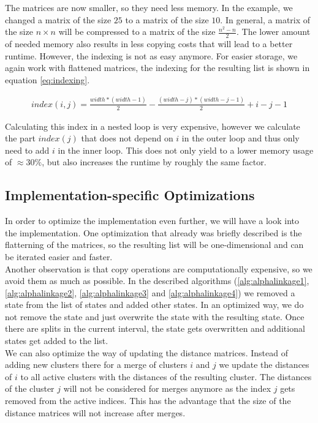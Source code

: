 The matrices are now smaller, so they need less memory. In the example, we changed a matrix of the size $25$ to a matrix of the size $10$. In general, a matrix of the size $n \times n$ will be compressed to a matrix of the size $\frac{n^2-n}{2}$. The lower amount of needed memory also results in less copying costs that will lead to a better runtime. However, the indexing is not as easy anymore. For easier storage, we again work with flattened matrices, the indexing for the resulting list is shown in equation \ref{eq:indexing}.

\begin{equation}
    \begin{aligned}
        index(i,j) = \frac{width * (width - 1)}{2} - \frac{(width - j) * (width - j - 1)}{2} + i - j - 1
    \end{aligned}
    \label{eq:indexing}
\end{equation}

Calculating this index in a nested loop is very expensive, however we calculate the part $index(j)$ that does not depend on $i$ in the outer loop and thus only need to add $i$ in the inner loop. This does not only yield to a lower memory usage of $\approx 30\%$, but also increases the runtime by roughly the same factor.

\subsection{Implementation-specific Optimizations}

In order to optimize the implementation even further, we will have a look into the implementation. One optimization that already was briefly described is the flatterning of the matrices, so the resulting list will be one-dimensional and can be iterated easier and faster.\\

Another observation is that copy operations are computationally expensive, so we avoid them as much as possible. In the described algorithms (\ref{alg:alphalinkage1}, \ref{alg:alphalinkage2}, \ref{alg:alphalinkage3} and \ref{alg:alphalinkage4}) we removed a state from the list of states and added other states. In an optimized way, we do not remove the state and just overwrite the state with the resulting state. Once there are splits in the current interval, the state gets overwritten and additional states get added to the list.\\

We can also optimize the way of updating the distance matrices. Instead of adding new clusters there for a merge of clusters $i$ and $j$ we update the distances of $i$ to all active clusters with the distances of the resulting cluster. The distances of the cluster $j$ will not be considered for merges anymore as the index $j$ gets removed from the active indices. This has the advantage that the size of the distance matrices will not increase after merges.\\

